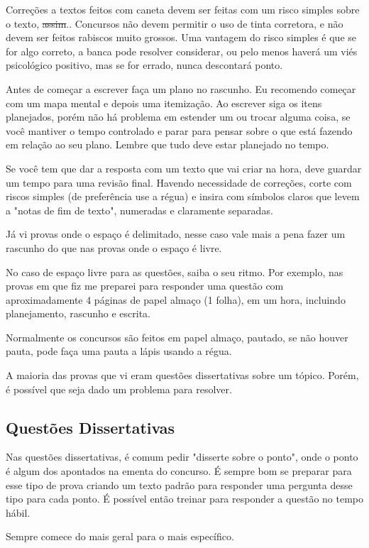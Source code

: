 \documentclass{article}
\begin{document}
Correções a textos feitos com caneta devem ser feitas com um risco simples sobre o texto, \st{assim}.. Concursos não devem permitir o uso de tinta corretora, e não devem ser feitos rabiscos muito grossos. Uma vantagem do risco simples é que se for algo correto, a banca pode resolver considerar, ou pelo menos haverá um viés psicológico positivo, mas se for errado, nunca descontará ponto.

Antes de começar a escrever faça um plano no rascunho. Eu recomendo começar com um mapa mental e depois uma itemização. Ao escrever siga os itens planejados, porém não há problema em estender um ou trocar alguma coisa, se você mantiver o tempo controlado e parar para pensar sobre o que está fazendo em relação ao seu plano. Lembre que tudo deve estar planejado no tempo.

Se você tem que dar a resposta com um texto que vai criar na hora, deve guardar um tempo para uma revisão final. Havendo necessidade de correções, corte com riscos simples (de preferência use a régua) e insira com símbolos claros que levem a "notas de fim de texto", numeradas e claramente separadas.

Já vi provas onde o espaço é delimitado, nesse caso vale mais a  pena fazer um rascunho do que nas provas onde o espaço é livre.

No caso de espaço livre para as questões, saiba o seu ritmo. Por exemplo, nas provas em que fiz me preparei para responder uma questão com aproximadamente 4 páginas de papel almaço (1 folha), em um hora, incluindo planejamento, rascunho e escrita.

Normalmente os concursos são feitos em papel almaço, pautado, se não houver pauta, pode faça uma pauta a lápis usando a régua.

A maioria das provas que vi eram questões dissertativas sobre um tópico. Porém, é possível que seja dado um problema para resolver.

\subsection{Questões Dissertativas}

Nas questões dissertativas, é comum pedir "disserte sobre o ponto", onde o ponto é algum dos apontados na ementa do concurso.
É sempre bom se preparar para esse tipo de prova criando um texto padrão para responder uma pergunta desse tipo para cada ponto.
É possível então treinar para responder a questão no tempo hábil.

Sempre comece do mais geral para o mais específico.
\end{document}
